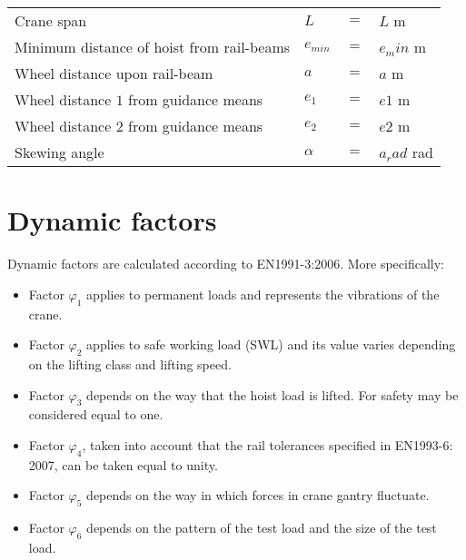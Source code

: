 \begin{tabular}{llcl}
    Crane span                                      &$L$          &$=$ &${{ L }}$ m \\
    Minimum distance of hoist from rail-beams       &$e_{min}$    &$=$ &${{ e_min }}$ m \\
    Wheel distance upon rail-beam                   &$a$          &$=$ &${{ a }}$ m \\
    Wheel distance $1$ from guidance means          &$e_1$        &$=$ &${{ e1 }}$ m \\
    Wheel distance $2$ from guidance means          &$e_2$        &$=$ &${{ e2 }}$ m \\
    Skewing angle                                   &$α$          &$=$ &${{ a_rad }}$ rad
\end{tabular}

\section{Dynamic factors}
Dynamic factors are calculated according to EΝ1991-3:2006. More specifically:

\begin{itemize}
    \item Factor $ φ_1 $ applies to permanent loads and represents the vibrations of the crane.
    \item Factor $ φ_2 $ applies to safe working load (SWL) and its value varies depending on the lifting class and lifting speed.
    \item Factor $ φ_3 $ depends on the way that the hoist load is lifted.  For safety may be considered equal to one.
    \item Factor $ φ_4 $, taken into account that the rail tolerances specified in EN1993-6: 2007, can be taken equal to unity.
    \item Factor $ φ_5 $ depends on the way in which forces in crane gantry fluctuate.
    \item Factor $ φ_6 $ depends on the pattern of the test load and the size of the test load.
\end{itemize}

